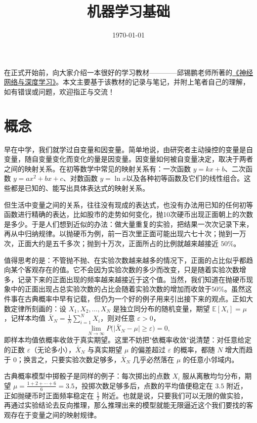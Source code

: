 \documentclass[UTF8,a4paper,12pt]{ctexart}
\title{机器学习基础}
\date{\today}
\numberwithin{equation}{section}
\begin{document}
\maketitle

	在正式开始前，向大家介绍一本很好的学习教材————邱锡鹏老师所著的\href{https://nndl.ai/nndl-v2/}{《神经网络与深度学习》}。本文主要基于该教材的记录与笔记，并附上笔者自己的理解，如有错误或问题，欢迎指正与交流！

\section{概念}
	早在中学，我们就学过自变量和因变量。简单地说，由研究者主动操控的变量是自变量，随自变量变化而变化的量是因变量。因变量如何被自变量决定，取决于两者之间的映射关系。在初等数学中常见的映射关系有：一次函数 $y=kx+b$、二次函数 $y=ax^{2}+bx+c$、对数函数 $y=\ln x$以及各种初等函数及它们的线性组合。这些都是已知的、能写出具体表达式的映射关系。

	但生活中变量之间的关系，往往没有现成的表达式，也没有办法用已知的任何初等函数进行精确的表达，比如股市的走势如何变化，抛10次硬币出现正面朝上的次数是多少。于是人们想到近似的办法：做大量重复的实验，把结果一次次记录下来，再从中归纳规律。以抛硬币为例，前一百次里正面可能出现六七十次；抛到一万次，正面大约是五千多次；抛到十万次，正面所占的比例就越来越接近 $50\%$。

	值得思考的是：不管抛不抛、在实验次数越来越多的情况下，正面的占比似乎都趋向某个客观存在的值。它不会因为实验次数的多少而改变，只是随着实验次数增多，记录下来的正面出现的频率越来越接近于这个值。当然，我们知道在抛硬币现象中的正面出现占总实验次数的占比会随着实验次数的增加而收敛于$50\%$。虽然这件事在古典概率中早有记载，但仍为一个好的例子用来引出接下来的观点。正如大数定律所刻画的：设 $X_{1},X_{2},\ldots,X_{N}$ 是独立同分布的随机变量，期望 $\mathbb{E}[X_{i}]=\mu$，记样本均值 $\bar{X}_{N}=\frac{1}{N}\sum_{i=1}^{N}X_{i}$，则对任意 $\varepsilon>0$，
	\begin{equation}\label{eq:1.1}
	\lim_{N\to\infty}P\bigl(\bigl|\bar{X}_{N}-\mu\bigr|\ge\varepsilon\bigr)=0,
	\end{equation}
	即样本均值依概率收敛于真实期望。这里不妨把"依概率收敛"说清楚：对任意给定的正数 $\varepsilon$（无论多小），$\bar{X}_{N}$ 与真实期望 $\mu$ 的偏差超过 $\varepsilon$ 的概率，都随 $N$ 增大而趋于 $0$；换言之，只要实验次数足够多，$\bar{X}_{N}$ 几乎必然落在 $\mu$ 的任意小邻域内。
	
	古典概率模型中掷骰子是同样的例子：每次掷出的点数 $X_{i}$ 服从离散均匀分布，期望 $\mu=\frac{1+2+\cdots+6}{6}=3.5$，投掷次数足够多后，点数的平均值便稳定在 $3.5$ 附近，正如抛硬币时正面频率稳定在 $\frac{1}{2}$ 附近。也就是说，只要我们可以无限的做实验，再通过实验结论去反向推理，那么推理出来的模型就能无限逼近这个我们要找的客观存在于变量之间的映射规律。
	
\end{document}
